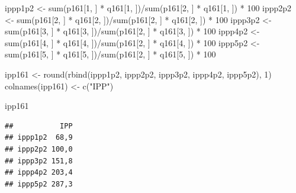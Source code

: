 \documentclass[
]{book}
\newenvironment{Shaded}{\begin{snugshade}}{\end{snugshade}}
\newcommand{\DecValTok}[1]{\textcolor[rgb]{0.00,0.00,0.81}{#1}}
\newcommand{\FunctionTok}[1]{\textcolor[rgb]{0.00,0.00,0.00}{#1}}
\newcommand{\NormalTok}[1]{#1}
\newcommand{\OtherTok}[1]{\textcolor[rgb]{0.56,0.35,0.01}{#1}}
\newcommand{\SpecialCharTok}[1]{\textcolor[rgb]{0.00,0.00,0.00}{#1}}
\newcommand{\StringTok}[1]{\textcolor[rgb]{0.31,0.60,0.02}{#1}}
\begin{document}
\begin{Shaded}
\begin{Highlighting}[]
\NormalTok{ippp1p2 }\OtherTok{\textless{}{-}} \FunctionTok{sum}\NormalTok{(p161[}\DecValTok{1}\NormalTok{, ] }\SpecialCharTok{*}\NormalTok{ q161[}\DecValTok{1}\NormalTok{, ])}\SpecialCharTok{/}\FunctionTok{sum}\NormalTok{(p161[}\DecValTok{2}\NormalTok{, ] }\SpecialCharTok{*} 
\NormalTok{    q161[}\DecValTok{1}\NormalTok{, ]) }\SpecialCharTok{*} \DecValTok{100}
\NormalTok{ippp2p2 }\OtherTok{\textless{}{-}} \FunctionTok{sum}\NormalTok{(p161[}\DecValTok{2}\NormalTok{, ] }\SpecialCharTok{*}\NormalTok{ q161[}\DecValTok{2}\NormalTok{, ])}\SpecialCharTok{/}\FunctionTok{sum}\NormalTok{(p161[}\DecValTok{2}\NormalTok{, ] }\SpecialCharTok{*} 
\NormalTok{    q161[}\DecValTok{2}\NormalTok{, ]) }\SpecialCharTok{*} \DecValTok{100}
\NormalTok{ippp3p2 }\OtherTok{\textless{}{-}} \FunctionTok{sum}\NormalTok{(p161[}\DecValTok{3}\NormalTok{, ] }\SpecialCharTok{*}\NormalTok{ q161[}\DecValTok{3}\NormalTok{, ])}\SpecialCharTok{/}\FunctionTok{sum}\NormalTok{(p161[}\DecValTok{2}\NormalTok{, ] }\SpecialCharTok{*} 
\NormalTok{    q161[}\DecValTok{3}\NormalTok{, ]) }\SpecialCharTok{*} \DecValTok{100}
\NormalTok{ippp4p2 }\OtherTok{\textless{}{-}} \FunctionTok{sum}\NormalTok{(p161[}\DecValTok{4}\NormalTok{, ] }\SpecialCharTok{*}\NormalTok{ q161[}\DecValTok{4}\NormalTok{, ])}\SpecialCharTok{/}\FunctionTok{sum}\NormalTok{(p161[}\DecValTok{2}\NormalTok{, ] }\SpecialCharTok{*} 
\NormalTok{    q161[}\DecValTok{4}\NormalTok{, ]) }\SpecialCharTok{*} \DecValTok{100}
\NormalTok{ippp5p2 }\OtherTok{\textless{}{-}} \FunctionTok{sum}\NormalTok{(p161[}\DecValTok{5}\NormalTok{, ] }\SpecialCharTok{*}\NormalTok{ q161[}\DecValTok{5}\NormalTok{, ])}\SpecialCharTok{/}\FunctionTok{sum}\NormalTok{(p161[}\DecValTok{2}\NormalTok{, ] }\SpecialCharTok{*} 
\NormalTok{    q161[}\DecValTok{5}\NormalTok{, ]) }\SpecialCharTok{*} \DecValTok{100}

\NormalTok{ipp161 }\OtherTok{\textless{}{-}} \FunctionTok{round}\NormalTok{(}\FunctionTok{rbind}\NormalTok{(ippp1p2, ippp2p2, ippp3p2, ippp4p2, }
\NormalTok{    ippp5p2), }\DecValTok{1}\NormalTok{)}
\FunctionTok{colnames}\NormalTok{(ipp161) }\OtherTok{\textless{}{-}} \FunctionTok{c}\NormalTok{(}\StringTok{"IPP"}\NormalTok{)}

\NormalTok{ipp161}
\end{Highlighting}
\end{Shaded}

\begin{verbatim}
##           IPP
## ippp1p2  68,9
## ippp2p2 100,0
## ippp3p2 151,8
## ippp4p2 203,4
## ippp5p2 287,3
\end{verbatim}
\end{document}
